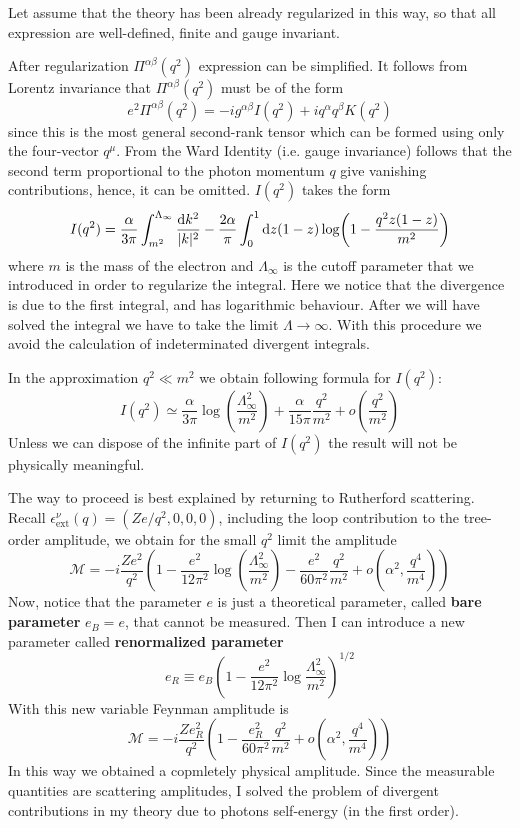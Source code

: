 \documentclass[TheoreticalPhy_ModB.tex]{subfiles}
\begin{document}
Let assume that the theory has been already regularized in this way, so that all expression are well-defined, finite and gauge invariant.

After regularization $\Pi^{\alpha\beta}(q^2)$ expression can be simplified. It follows from Lorentz invariance that $\Pi^{\alpha\beta}(q^2)$ must be of the form
\[e^2\Pi^{\alpha\beta}(q^2)=-ig^{\alpha\beta}I(q^2)+iq^\alpha q^\beta K(q^2)\]
since this is the most general second-rank tensor which can be formed using only the four-vector $q^\mu$. From the Ward Identity (i.e. gauge invariance) follows that the second term proportional to the photon momentum $q$ give vanishing contributions, hence, it can be omitted.
$I(q^2)$ takes the form
\[I(q^2)=\frac\alpha{3\pi}\int^{\Lambda_\infty}_{m^2}\frac{\textup{d} k^2}{|k|^2}-\frac{2\alpha}{\pi}\int_0^1\textup{d} z(1-z)\log(1-\frac{q^2z(1-z)}{m^2})\]
where $m$ is the mass of the electron and $\Lambda_\infty$ is the cutoff parameter that we introduced in order to regularize the integral. Here we notice that the divergence is due to the first integral, and has logarithmic behaviour. After we will have solved the integral we have to take the limit $\Lambda\rightarrow\infty$. With this procedure we avoid the calculation of indeterminated divergent integrals.

In the approximation $q^2\ll m^2$ we obtain following formula for $I(q^2)$:
\[I(q^2)\simeq\frac\alpha{3\pi}\log(\frac{\Lambda_\infty^2}{m^2})+\frac\alpha{15\pi}\frac{q^2}{m^2}+o\left(\frac{q^2}{m^2}\right)\]
Unless we can dispose of the infinite part of $I(q^2)$ the result will not be physically meaningful.

The way to proceed is best explained by returning to Rutherford scattering. Recall $\epsilon^\nu_{\text{ext}}(q)=(Ze/q^2,0,0,0)$, including the loop contribution to the tree-order amplitude, we obtain for the small $q^2$ limit the amplitude
\[\mathcal M=-i\frac{Ze^2}{q^2}\left(1-\frac{e^2}{12\pi^2}\log(\frac{\Lambda_\infty^2}{m^2})-\frac{e^2}{60\pi^2}\frac{q^2}{m^2}+o\left(\alpha^2, \frac{q^4}{m^4}\right)\right)\]
Now, notice that the parameter $e$ is just a theoretical parameter, called \textbf{bare parameter} $e_B=e$, that cannot be measured. Then I can introduce a new parameter called \textbf{renormalized parameter}
\[e_R\equiv e_B\left(1-\frac{e^2}{12\pi^2}\log\frac{\Lambda_\infty^2}{m^2}\right)^{1/2}\]
With this new variable Feynman amplitude is
\[\mathcal M=-i\frac{Ze_R^2}{q^2}\left(1-\frac{e_R^2}{60\pi^2}\frac{q^2}{m^2}+o\left(\alpha^2, \frac{q^4}{m^4}\right)\right)\]
In this way we obtained a copmletely physical amplitude. Since the measurable quantities are scattering amplitudes, I solved the problem of divergent contributions in my theory due to photons self-energy (in the first order).
\end{document}

